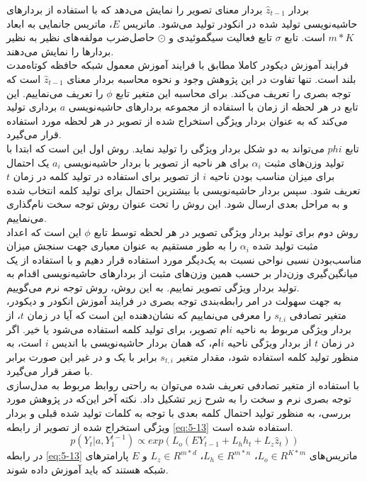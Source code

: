 بردار $\hat{z}_{t-1}$ بردار معنای تصویر را نمایش می‌دهد که با استفاده از بردارهای حاشیه‌نویسی تولید شده در انکودر تولید می‌شود. ماتریس $E$، ماتریس جانمایی به ابعاد $m * K$ است. تابع $\sigma$ تابع فعالیت سیگموئیدی و $\odot$ حاصل‌ضرب مولفه‌های نظیر به نظیر بردارها را نمایش می‌دهند.
\\
فرایند آموزش دیکودر کاملا مطابق با فرایند آموزش معمول شبکه حافظه کوتاه‌مدت بلند است. تنها تفاوت در این پژوهش وجود و نحوه محاسبه بردار معنای $\hat{z}_{t-1}$  است که توجه بصری را تعریف می‌کند. برای محاسبه این متغیر تابع $\phi$ را تعریف می‌نماییم. این تابع در هر لحظه از زمان با استفاده از مجموعه بردارهای حاشیه‌نویسی $a$ برداری تولید می‌کند که به عنوان بردار ویژگی‌ استخراج شده از تصویر در هر لحظه مورد استفاده قرار می‌گیرد.
\\
تابع $phi$ می‌تواند به دو شکل بردار ویژگی را تولید نماید. روش اول این است که ابتدا با تولید وزن‌های مثبت $\alpha_i$ برای هر ناحیه از تصویر با بردار حاشیه‌نویسی $a_i$ یک احتمال برای میزان مناسب بودن ناحیه $i$ از تصویر برای استفاده در تولید کلمه در زمان $t$ تعریف شود. سپس بردار حاشیه‌نویسی با بیشترین احتمال برای تولید کلمه انتخاب شده و به مراحل بعدی ارسال شود. این روش را تحت عنوان روش توجه سخت نام‌گذاری می‌نماییم.
\\
روش دوم برای تولید بردار ویژگی تصویر در هر لحظه توسط تابع $\phi$ این است که اعداد مثبت تولید شده $\alpha_i$ را به طور مستقیم به عنوان معیاری جهت سنجش میزان مناسب‌بودن نسبی نواحی نسبت به یک‌دیگر مورد استفاده قرار دهیم و با استفاده از یک میانگین‌گیری وزن‌دار بر حسب همین وزن‌های مثبت از بردارهای حاشیه‌نویسی اقدام به تولید بردار ویژگی تصویر نماییم. به این روش، روش توجه نرم  می‌گوییم.
\\
به جهت سهولت در امر رابطه‌بندی توجه بصری در فرایند آموزش انکودر و دیکودر، متغیر تصادفی $s_{t.i}$ را معرفی می‌نماییم که نشان‌دهنده این است که آیا در زمان $t$، از بردار ویژگی مربوط به ناحیه $i$ام تصویر، برای تولید کلمه استفاده می‌شود یا خیر. اگر در زمان $t$ از بردار ویژگی ناحیه $i$ام، که همان بردار حاشیه‌نویسی با اندیس $i$ است، به منظور تولید کلمه استفاده شود، مقدار متغیر $s_{t,i}$ برابر با یک و در غیر این‌ صورت برابر با صفر قرار می‌‌گیرد.
\\
با استفاده از متغیر تصادفی تعریف شده می‌توان به راحتی روابط مربوط به مدل‌سازی توجه بصری نرم و سخت را به شرح زیر تشکیل داد. نکته آخر این‌که در پژوهش مورد بررسی، به منظور تولید احتمال کلمه بعدی با توجه به کلمات تولید شده قبلی و بردار ویژگی استخراج شده از تصویر از رابطه \eqref{eq:5-13} استفاده شده است.
\begin{equation}
p(Y_t | a, Y_1^{t-1}) \propto exp(L_o(EY_{t-1} + L_h h_{t} + L_z \hat{z}_t)) 
\label{eq:5-13}
\end{equation}
در رابطه \eqref{eq:5-13} ماتریس‌های $L_o \in R^{K*m}$، $L_h \in R^{m*n}$، $L_z \in R^{m*d}$ و $E$ پارامترهای شبکه هستند که باید آموزش داده شوند.

